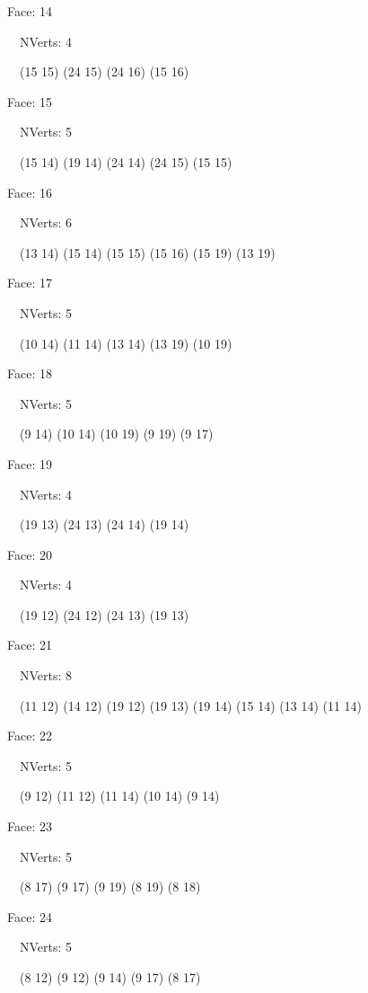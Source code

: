\documentclass{article}
\begin{document}
{\footnotesize 

Face: 14

\   \    NVerts: 4

 \   \   (15 15) (24 15) (24 16) (15 16)}

{\footnotesize 

Face: 15

\   \    NVerts: 5

 \   \   (15 14) (19 14) (24 14) (24 15) (15 15)}

{\footnotesize 

Face: 16

\   \    NVerts: 6

 \   \   (13 14) (15 14) (15 15) (15 16) (15 19) (13 19)}

{\footnotesize 

Face: 17

\   \    NVerts: 5

 \   \   (10 14) (11 14) (13 14) (13 19) (10 19)}

{\footnotesize 

Face: 18

\   \    NVerts: 5

 \   \   (9 14) (10 14) (10 19) (9 19) (9 17)}

{\footnotesize 

Face: 19

\   \    NVerts: 4

 \   \   (19 13) (24 13) (24 14) (19 14)}

{\footnotesize 

Face: 20

\   \    NVerts: 4

 \   \   (19 12) (24 12) (24 13) (19 13)}

{\footnotesize 

Face: 21

\   \    NVerts: 8

 \   \   (11 12) (14 12) (19 12) (19 13) (19 14) (15 14) (13 14) (11 14)}

{\footnotesize 

Face: 22

\   \    NVerts: 5

 \   \   (9 12) (11 12) (11 14) (10 14) (9 14)}

{\footnotesize 

Face: 23

\   \    NVerts: 5

 \   \   (8 17) (9 17) (9 19) (8 19) (8 18)}

{\footnotesize 

Face: 24

\   \    NVerts: 5

 \   \   (8 12) (9 12) (9 14) (9 17) (8 17)}
\end{document}
